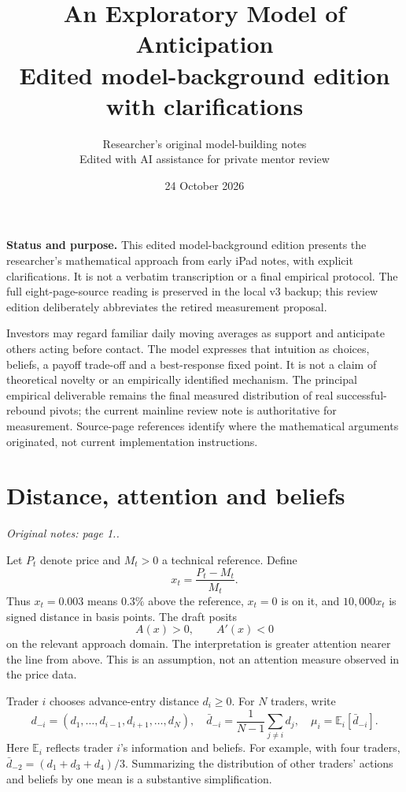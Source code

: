 \documentclass[11pt,a4paper]{article}
\title{An Exploratory Model of Anticipation\\
\large Edited model-background edition with clarifications}
\author{Researcher's original model-building notes\\
\normalsize Edited with AI assistance for private mentor review}
\date{24 October 2026}
\newcommand{\E}{\mathbb{E}}
\newcommand{\sourcepage}[1]{\textit{Original notes: #1.}}
\begin{document}
\maketitle

\textbf{Status and purpose.} This edited model-background edition presents the
researcher's mathematical approach from early iPad notes, with explicit
clarifications. It is not a verbatim transcription or a final empirical protocol.
The full eight-page-source reading is preserved in the local v3 backup; this
review edition deliberately abbreviates the retired measurement proposal.

Investors may regard familiar daily moving averages as support and anticipate
others acting before contact. The model expresses that intuition as choices,
beliefs, a payoff trade-off and a best-response fixed point. It is not a claim
of theoretical novelty or an empirically identified mechanism. The principal
empirical deliverable remains the final measured distribution of real
successful-rebound pivots; the current mainline review note is authoritative
for measurement. Source-page references identify where the mathematical
arguments originated, not current implementation instructions.

\section{Distance, attention and beliefs}
\sourcepage{page 1.}

Let $P_t$ denote price and $M_t>0$ a technical reference. Define
\begin{equation}
 x_t=\frac{P_t-M_t}{M_t}.
\end{equation}
Thus $x_t=0.003$ means $0.3\%$ above the reference, $x_t=0$ is on it,
and $10{,}000x_t$ is signed distance in basis points. The draft posits
\begin{equation}
 A(x)>0,\qquad A'(x)<0
\end{equation}
on the relevant approach domain. The interpretation is greater attention nearer
the line from above. This is an assumption, not an attention measure observed
in the price data.

Trader $i$ chooses advance-entry distance $d_i\geq0$. For $N$ traders, write
\begin{equation}
 d_{-i}=(d_1,\ldots,d_{i-1},d_{i+1},\ldots,d_N),\quad
 \bar d_{-i}=\frac{1}{N-1}\sum_{j\ne i}d_j,\quad
 \mu_i=\E_i[\bar d_{-i}].
\end{equation}
Here $\E_i$ reflects trader $i$'s information and beliefs. For example, with four
traders, $\bar d_{-2}=(d_1+d_3+d_4)/3$. Summarizing the distribution of other
traders' actions and beliefs by one mean is a substantive simplification.
\end{document}
